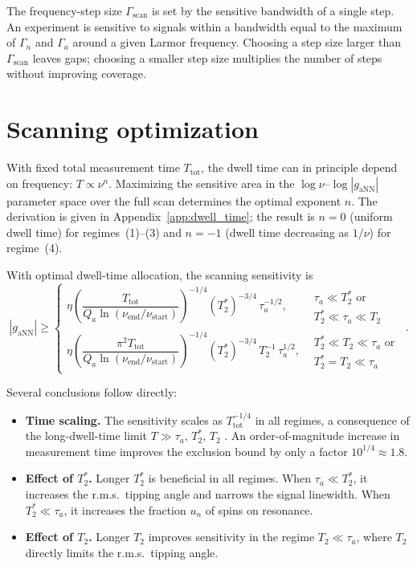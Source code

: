 The frequency-step size $\Gamma_{\mathrm{scan}}$ is set by the sensitive bandwidth of a single step.
An experiment is sensitive to signals within a bandwidth equal to the maximum of $\Gamma_n$ and $\Gamma_a$ around a given Larmor frequency.
Choosing a step size larger than $\Gamma_{\mathrm{scan}}$ leaves gaps; choosing a smaller step size multiplies the number of steps without improving coverage.

\section{Scanning optimization}\label{sec:experiment:optimization}

With fixed total measurement time $T_{\mathrm{tot}}$, the dwell time can in principle depend on frequency: $T \propto \nu^n$.
Maximizing the sensitive area in the $\log\nu$--$\log|g_{\mathrm{aNN}}|$ parameter space over the full scan determines the optimal exponent $n$.
The derivation is given in Appendix~\ref{app:dwell_time}; the result is $n=0$ (uniform dwell time) for regimes~(1)--(3) and $n=-1$ (dwell time decreasing as $1/\nu$) for regime~(4).

With optimal dwell-time allocation, the scanning sensitivity is
\begin{equation}
    |g_{\mathrm{aNN}}| \geqslant
    \begin{cases}
    \eta
    \left(\dfrac{T_{\mathrm{tot}}}{Q_a\ln\left(\nu_{\mathrm{end}}/\nu_{\mathrm{start}} \right)}\right)^{-1/4}
    (T_2^*)^{-3/4}\, \tau_a^{-1/2},
    & \substack{\tau_a\ll T_2^* \text{ or}\\ T_2^*\ll\tau_a\ll T_2} \\[10pt]
    \eta
    \left(\dfrac{\pi^2 T_{\mathrm{tot}}}{Q_a\ln\left(\nu_{\mathrm{end}}/\nu_{\mathrm{start}} \right)}\right)^{-1/4}
    (T_2^*)^{-3/4}\, T_2^{-1}\, \tau_a^{1/2},
    & \substack{T_2^* \ll T_2 \ll \tau_a \text{ or}\\ T_2^*=T_2 \ll \tau_a}
    \end{cases}
    \,.\label{eq:gaNN_Ttot_optimal}
\end{equation}

Several conclusions follow directly:
\begin{itemize}
    \item \textbf{Time scaling.}
    The sensitivity scales as $T_{\mathrm{tot}}^{-1/4}$ in all regimes, a consequence of the long-dwell-time limit $T \gg \tau_a,\,T_2^*,\,T_2$ \cite{CASPErProposal2014,Aybas_2021_Quantum_sensitivity}.
    An order-of-magnitude increase in measurement time improves the exclusion bound by only a factor $10^{1/4}\approx1.8$.

    \item \textbf{Effect of $T_2^*$.}
    Longer $T_2^*$ is beneficial in all regimes.
    When $\tau_a \ll T_2^*$, it increases the r.m.s.\ tipping angle and narrows the signal linewidth.
    When $T_2^* \ll \tau_a$, it increases the fraction $u_n$ of spins on resonance.

    \item \textbf{Effect of $T_2$.}
    Longer $T_2$ improves sensitivity in the regime $T_2 \ll \tau_a$, where $T_2$ directly limits the r.m.s.\ tipping angle.
\end{itemize}

